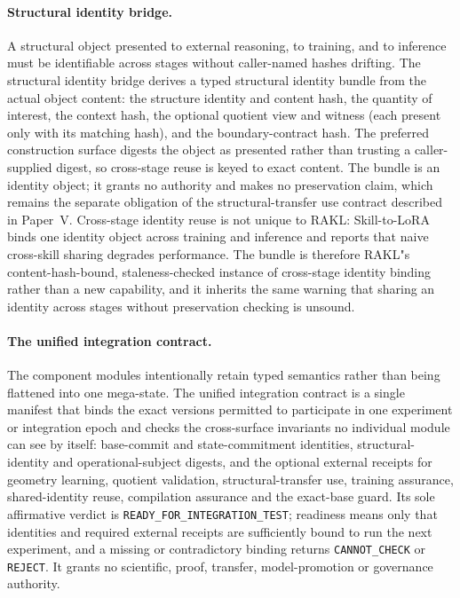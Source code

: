 \paragraph{Structural identity bridge.}
A structural object presented to external reasoning, to training, and to inference must be identifiable across stages without caller-named hashes drifting. The structural identity bridge derives a typed structural identity bundle from the actual object content: the structure identity and content hash, the quantity of interest, the context hash, the optional quotient view and witness (each present only with its matching hash), and the boundary-contract hash. The preferred construction surface digests the object as presented rather than trusting a caller-supplied digest, so cross-stage reuse is keyed to exact content. The bundle is an identity object; it grants no authority and makes no preservation claim, which remains the separate obligation of the structural-transfer use contract described in Paper~V. Cross-stage identity reuse is not unique to RAKL: Skill-to-LoRA~\cite{zhang2026skill2lora} binds one identity object across training and inference and reports that naive cross-skill sharing degrades performance. The bundle is therefore RAKL"s content-hash-bound, staleness-checked instance of cross-stage identity binding rather than a new capability, and it inherits the same warning that sharing an identity across stages without preservation checking is unsound.

\paragraph{The unified integration contract.}
The component modules intentionally retain typed semantics rather than being flattened into one mega-state. The unified integration contract is a single manifest that binds the exact versions permitted to participate in one experiment or integration epoch and checks the cross-surface invariants no individual module can see by itself: base-commit and state-commitment identities, structural-identity and operational-subject digests, and the optional external receipts for geometry learning, quotient validation, structural-transfer use, training assurance, shared-identity reuse, compilation assurance and the exact-base guard. Its sole affirmative verdict is \texttt{READY\_FOR\_INTEGRATION\_TEST}; readiness means only that identities and required external receipts are sufficiently bound to run the next experiment, and a missing or contradictory binding returns \texttt{CANNOT\_CHECK} or \texttt{REJECT}. It grants no scientific, proof, transfer, model-promotion or governance authority.

